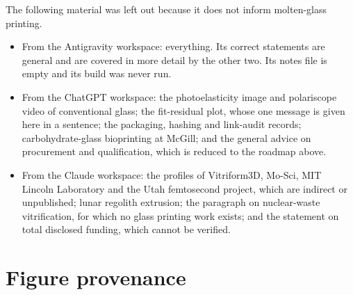 \documentclass[10pt,a4paper]{article}
\begin{document}
The following material was left out because it does not inform molten-glass printing.

\begin{itemize}
  \item From the Antigravity workspace: everything. Its correct statements are general and are covered in more detail by the other two. Its notes file is empty and its build was never run.
  \item From the ChatGPT workspace: the photoelasticity image and polariscope video of conventional glass; the fit-residual plot, whose one message is given here in a sentence; the packaging, hashing and link-audit records; carbohydrate-glass bioprinting at McGill; and the general advice on procurement and qualification, which is reduced to the roadmap above.
  \item From the Claude workspace: the profiles of Vitriform3D, Mo-Sci, MIT Lincoln Laboratory and the Utah femtosecond project, which are indirect or unpublished; lunar regolith extrusion; the paragraph on nuclear-waste vitrification, for which no glass printing work exists; and the statement on total disclosed funding, which cannot be verified.
\end{itemize}

\section{Figure provenance}\label{sec:figures}
\end{document}
